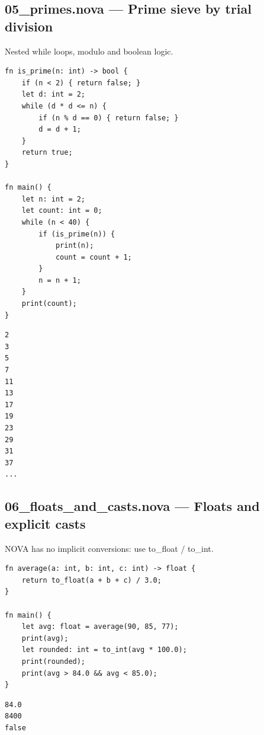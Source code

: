 \subsection*{05\_primes.nova --- Prime sieve by trial division}
\noindent Nested while loops, modulo and boolean logic.
\begin{lstlisting}[language=nova,]
fn is_prime(n: int) -> bool {
    if (n < 2) { return false; }
    let d: int = 2;
    while (d * d <= n) {
        if (n % d == 0) { return false; }
        d = d + 1;
    }
    return true;
}

fn main() {
    let n: int = 2;
    let count: int = 0;
    while (n < 40) {
        if (is_prime(n)) {
            print(n);
            count = count + 1;
        }
        n = n + 1;
    }
    print(count);
}
\end{lstlisting}
\begin{tcolorbox}[colback=green!4,colframe=green!45!black,title={Program output (optimized VM)},fonttitle=\bfseries\small,boxsep=2pt,left=4pt,right=4pt,top=2pt,bottom=2pt]
\begin{lstlisting}[basicstyle=\ttfamily\scriptsize,frame=none,backgroundcolor=\color{white}]
2
3
5
7
11
13
17
19
23
29
31
37
...
\end{lstlisting}
\end{tcolorbox}
\subsection*{06\_floats\_and\_casts.nova --- Floats and explicit casts}
\noindent NOVA has no implicit conversions: use to\_float / to\_int.
\begin{lstlisting}[language=nova,]
fn average(a: int, b: int, c: int) -> float {
    return to_float(a + b + c) / 3.0;
}

fn main() {
    let avg: float = average(90, 85, 77);
    print(avg);
    let rounded: int = to_int(avg * 100.0);
    print(rounded);
    print(avg > 84.0 && avg < 85.0);
}
\end{lstlisting}
\begin{tcolorbox}[colback=green!4,colframe=green!45!black,title={Program output (optimized VM)},fonttitle=\bfseries\small,boxsep=2pt,left=4pt,right=4pt,top=2pt,bottom=2pt]
\begin{lstlisting}[basicstyle=\ttfamily\scriptsize,frame=none,backgroundcolor=\color{white}]
84.0
8400
false
\end{lstlisting}
\end{tcolorbox}
